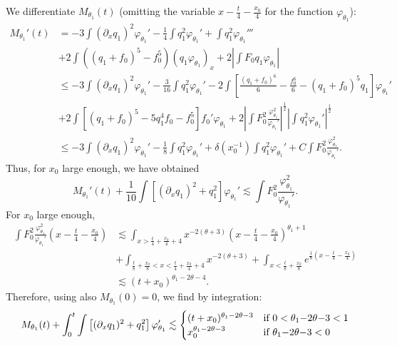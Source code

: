 \documentclass[11pt,a4paper,reqno]{amsart}
\theoremstyle{remark}
\numberwithin{equation}{section}
\newcommand{\be}{\begin{equation}}
\newcommand{\ee}{\end{equation}}
\begin{document}
We differentiate $M_{\theta_1}(t)$ (omitting the variable $x - \frac t 4 - \frac {x_0} 4$ for the function $\varphi_{\theta_1}$):
\begin{align*}
M_{\theta_1}'(t) & = - 3 \int (\partial_x q_1)^2 \varphi_{\theta_1}' -\frac 14 \int q_1^2 \varphi_{\theta_1}'
+ \int q_1^2 \varphi_{\theta_1}'''  \\ &
+ 2 \int \left((q_1+f_0)^5 - f_0^5\right) (q_1 \varphi_{\theta_1})_x + 
2 \left|\int F_0 q_1 \varphi_{\theta_1} \right|\\
& \leq - 3 \int (\partial_x q_1)^2 \varphi_{\theta_1}' -\frac 3{16} \int q_1^2 \varphi_{\theta_1}'
- 2 \int \left[ \frac {(q_1+f_0)^6}6 - \frac   {f_0^6} 6-(q_1+f_0)^5 q_1\right] \varphi_{\theta_1}'
\\ & + 2 \int \left[ (q_1+f_0)^5 - 5 q_1^4 f_0-f_0^5\right] f_0' \varphi_{\theta_1}
+ 2 \left|\int F_0^2  \frac {\varphi_{\theta_1}^2}{\varphi_{\theta_1}'} \right|^{\frac 12}
 \left| \int q_1^2 \varphi_{\theta_1}'\right|^{\frac 12} \\
& \leq - 3 \int (\partial_x q_1)^2 \varphi_{\theta_1}' -\frac 1 8 \int q_1^2 \varphi_{\theta_1}' 
+\delta(x_0^{-1}) \int q_1^2 \varphi_{\theta_1}'   + C \int F_0^2  \frac {\varphi_{\theta_1}^2}{\varphi_{\theta_1}'}     .
\end{align*}
Thus, for $x_0$ large enough, we have obtained
$$
M_{\theta_1}'(t) + \frac 1{10}  \int \left[ (\partial_x q_1)^2 + q_1^2 \right] \varphi_{\theta_1}'
\lesssim \int F_0^2  \frac {\varphi_{\theta_1}^2}{\varphi_{\theta_1}'}   .
$$
For $x_0$ large enough,
\begin{align}
   \int F_0^2  \frac {\varphi_{\theta_1}^2} {\varphi_{\theta_1}'}\left( x - \frac t 4 - \frac {x_0} 4\right)
& \lesssim    \int_{x>\frac t4 + \frac {x_0} 4 + 4} x^{-2(\theta+3)} \left( x - \frac t 4 - \frac {x_0} 4 \right)^{\theta_1+1}  \nonumber   \\
&  + \int_{\frac t8 + \frac {x_0} 8 < x<\frac t4 + \frac {x_0} 4 + 4}   x^{-2(\theta+3)}
+\int_{x< \frac t8 + \frac {x_0} 8} e^{\frac 18 (x-\frac t 4 - \frac {x_0} 4 )}\nonumber
\\ & \lesssim   (t+x_0)^{ \theta_1 -2 \theta-4 } . \label{Fzero}
\end{align}
Therefore, using also $M_{\theta_1}(0)=0$, we find by integration:
\be\label{eqM}
M_{\theta_1}(t) +  \int_0^t\int \left[ (\partial_x q_1)^2 + q_1^2 \right] \varphi_{\theta_1}' \lesssim 
\begin{cases} (t+x_0)^{ \theta_1 -2 \theta-3 } & \hbox{if $0<\theta_1 {-}2 \theta{-}3<1$}  \\
  x_0^{ \theta_1 -2 \theta-3 } & \hbox{if $\theta_1 {-}2 \theta{-}3<0$} \end{cases} \ee
\end{document}
